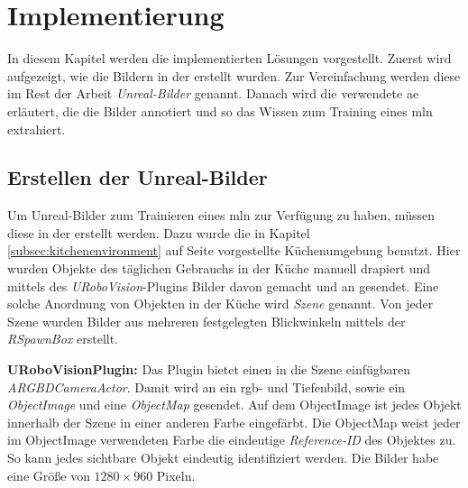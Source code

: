 \graphicspath{{./images/}}      
\def\CHAPTERONE{./chapters/Chapter-1} 

\chapter{Implementierung}
\label{chap:implementation}
%	

In diesem Kapitel werden die implementierten Lösungen vorgestellt. Zuerst wird aufgezeigt, wie die Bildern in der \unreal erstellt wurden. Zur Vereinfachung werden diese im Rest der Arbeit \textit{Unreal-Bilder} genannt. Danach wird die verwendete \gls{ae} erläutert, die die Bilder annotiert und so das Wissen zum  Training eines \gls{mln} extrahiert. \par

\section{Erstellen der Unreal-Bilder}
\label{sec:takingpics}

Um Unreal-Bilder zum Trainieren eines \gls{mln} zur Verfügung zu haben, müssen diese in der \unreal erstellt werden. Dazu wurde die in Kapitel \ref{subsec:kitchenenvironment} auf Seite \pageref{subsec:kitchenenvironment} vorgestellte Küchenumgebung benutzt. Hier wurden Objekte des täglichen Gebrauchs in der Küche manuell drapiert und mittels des \textit{URoboVision}-Plugins Bilder davon gemacht und an \robosherlock gesendet. Eine solche Anordnung von Objekten in der Küche wird \textit{Szene} genannt. Von jeder Szene wurden Bilder aus mehreren festgelegten Blickwinkeln mittels der \textit{RSpawnBox} erstellt. \par 

\textbf{URoboVisionPlugin:} Das Plugin bietet einen in die Szene einfügbaren \textit{ARGBDCameraActor}. Damit wird an \robosherlock ein \gls{rgb}- und Tiefenbild, sowie ein \textit{ObjectImage} und eine \textit{ObjectMap} gesendet. Auf dem ObjectImage ist jedes Objekt innerhalb der Szene in einer anderen Farbe eingefärbt. Die ObjectMap weist jeder im ObjectImage verwendeten Farbe die eindeutige \textit{Reference-ID} des Objektes zu. So kann jedes sichtbare Objekt eindeutig identifiziert werden. Die Bilder habe eine Größe von $1280 \times 960$ Pixeln. \par 

